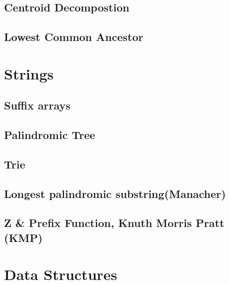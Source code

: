 \documentclass[12pt]{extarticle}
\begin{document}
\begin{multicols*}{2}
\subsection{Centroid Decompostion}


\subsection{Lowest Common Ancestor} 


\section{Strings}

\subsection{Suffix arrays} %


\subsection{Palindromic Tree} %


\subsection{Trie} %


% 

\subsection{Longest palindromic substring(Manacher)} %


\subsection{Z \& Prefix Function, Knuth Morris Pratt (KMP)} %


\section{Data Structures}


\end{multicols*}
\end{document}
